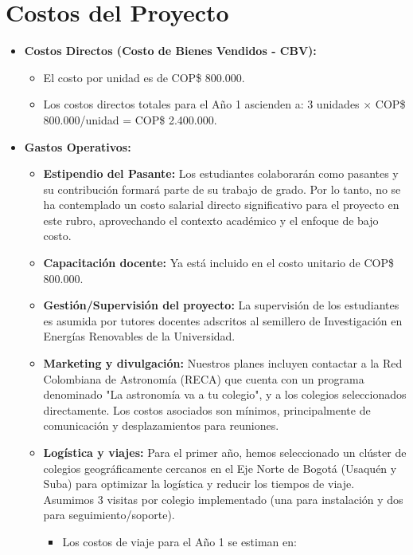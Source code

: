 \section{Costos del Proyecto}
\begin{itemize}
  \item \textbf{Costos Directos (Costo de Bienes Vendidos - CBV):}
    \begin{itemize}
      \item El costo por unidad es de COP\$ 800.000.
      \item Los costos directos totales para el Año 1 ascienden a:
        3 unidades $\times$ COP\$ 800.000/unidad = COP\$ 2.400.000.
    \end{itemize}
  \item \textbf{Gastos Operativos:}
    \begin{itemize}
      \item \textbf{Estipendio del Pasante:} Los estudiantes colaborarán como
        pasantes y su contribución formará parte de su trabajo de grado. Por
        lo tanto, no se ha contemplado un costo salarial directo
        significativo para el proyecto en este rubro, aprovechando el
        contexto académico y el enfoque de bajo costo.
      \item \textbf{Capacitación docente:} Ya está incluido en el costo
        unitario de COP\$ 800.000.
      \item \textbf{Gestión/Supervisión del proyecto:} La supervisión de los
        estudiantes es asumida por tutores docentes adscritos al semillero de
        Investigación en Energías Renovables de la Universidad.
      \item \textbf{Marketing y divulgación:} Nuestros planes incluyen
        contactar a la Red Colombiana de Astronomía (RECA) que cuenta con un
        programa denominado "La astronomía va a tu colegio", y a los colegios
        seleccionados directamente. Los costos asociados son mínimos,
        principalmente de comunicación y desplazamientos para reuniones.
      \item \textbf{Logística y viajes:} Para el primer año, hemos
        seleccionado un clúster de colegios geográficamente cercanos en el
        Eje Norte de Bogotá (Usaquén y Suba) para optimizar la logística y
        reducir los tiempos de viaje. Asumimos 3 visitas por colegio
        implementado (una para instalación y dos para seguimiento/soporte).
        \begin{itemize}
          \item Los costos de viaje para el Año 1 se estiman en:

\end{itemize}
\end{itemize}
\end{itemize}
